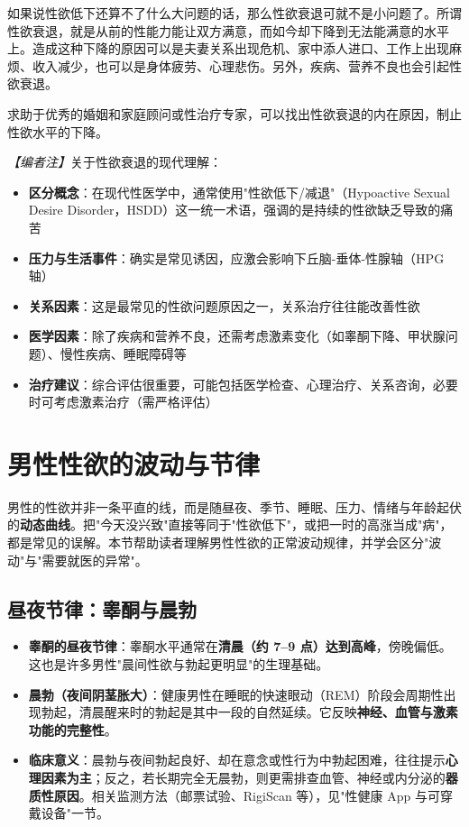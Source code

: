 如果说性欲低下还算不了什么大问题的话，那么性欲衰退可就不是小问题了。所谓性欲衰退，就是从前的性能力能让双方满意，而如今却下降到无法能满意的水平上。造成这种下降的原因可以是夫妻关系出现危机、家中添人进口、工作上出现麻烦、收入减少，也可以是身体疲劳、心理悲伤。另外，疾病、营养不良也会引起性欲衰退。

求助于优秀的婚姻和家庭顾问或性治疗专家，可以找出性欲衰退的内在原因，制止性欲水平的下降。

\noindent\textit{【编者注】}关于性欲衰退的现代理解：
\begin{itemize}
	\item \textbf{区分概念}：在现代性医学中，通常使用"性欲低下/减退"（Hypoactive Sexual Desire Disorder，HSDD）这一统一术语，强调的是持续的性欲缺乏导致的痛苦
	\item \textbf{压力与生活事件}：确实是常见诱因，应激会影响下丘脑-垂体-性腺轴（HPG轴）
	\item \textbf{关系因素}：这是最常见的性欲问题原因之一，关系治疗往往能改善性欲
	\item \textbf{医学因素}：除了疾病和营养不良，还需考虑激素变化（如睾酮下降、甲状腺问题）、慢性疾病、睡眠障碍等
	\item \textbf{治疗建议}：综合评估很重要，可能包括医学检查、心理治疗、关系咨询，必要时可考虑激素治疗（需严格评估）
\end{itemize}

\section{男性性欲的波动与节律}

男性的性欲并非一条平直的线，而是随昼夜、季节、睡眠、压力、情绪与年龄起伏的\textbf{动态曲线}。把"今天没兴致"直接等同于"性欲低下"，或把一时的高涨当成"病"，都是常见的误解。本节帮助读者理解男性性欲的正常波动规律，并学会区分"波动"与"需要就医的异常"。

\subsection{昼夜节律：睾酮与晨勃}

\begin{itemize}
	\item \textbf{睾酮的昼夜节律}：睾酮水平通常在\textbf{清晨（约 7--9 点）达到高峰}，傍晚偏低。这也是许多男性"晨间性欲与勃起更明显"的生理基础。
	\item \textbf{晨勃（夜间阴茎胀大）}：健康男性在睡眠的快速眼动（REM）阶段会周期性出现勃起，清晨醒来时的勃起是其中一段的自然延续。它反映\textbf{神经、血管与激素功能的完整性}。
	\item \textbf{临床意义}：晨勃与夜间勃起良好、却在意念或性行为中勃起困难，往往提示\textbf{心理因素为主}；反之，若长期完全无晨勃，则更需排查血管、神经或内分泌的\textbf{器质性原因}。相关监测方法（邮票试验、RigiScan 等），见"性健康 App 与可穿戴设备"一节。
\end{itemize}

